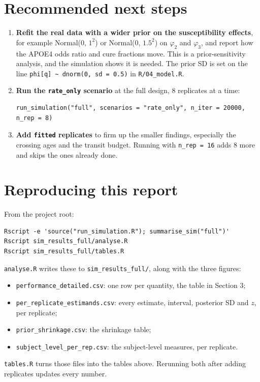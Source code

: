 \documentclass[11pt]{article}
\newcommand{\code}[1]{\texttt{\small #1}}
\begin{document}
\section{Recommended next steps}

\begin{enumerate}
  \item \textbf{Refit the real data with a wider prior on the susceptibility effects}, for example Normal(0, $1^2$) or Normal(0, $1.5^2$) on $\varphi_2$ and $\varphi_3$, and report how the APOE4 odds ratio and cure fractions move. This is a prior-sensitivity analysis, and the simulation shows it is needed. The prior SD is set on the line \code{phi[q] \textasciitilde{} dnorm(0, sd = 0.5)} in \code{R/04\_model.R}.
  \item \textbf{Run the \code{rate\_only} scenario} at the full design, 8 replicates at a time:
\begin{verbatim}
run_simulation("full", scenarios = "rate_only", n_iter = 20000, n_rep = 8)
\end{verbatim}
  \item \textbf{Add \code{fitted} replicates} to firm up the smaller findings, especially the crossing ages and the transit budget. Running with \code{n\_rep = 16} adds 8 more and skips the ones already done.
\end{enumerate}

\section{Reproducing this report}

From the project root:

\begin{verbatim}
Rscript -e 'source("run_simulation.R"); summarise_sim("full")'
Rscript sim_results_full/analyse.R
Rscript sim_results_full/tables.R
\end{verbatim}

\code{analyse.R} writes these to \code{sim\_results\_full/}, along with the three figures:
\begin{itemize}
  \item \code{performance\_detailed.csv}: one row per quantity, the table in Section 3;
  \item \code{per\_replicate\_estimands.csv}: every estimate, interval, posterior SD and $z$, per replicate;
  \item \code{prior\_shrinkage.csv}: the shrinkage table;
  \item \code{subject\_level\_per\_rep.csv}: the subject-level measures, per replicate.
\end{itemize}
\code{tables.R} turns those files into the tables above. Rerunning both after adding replicates updates every number.
\end{document}
